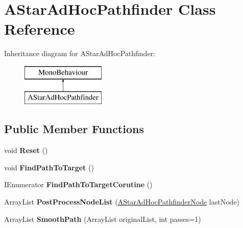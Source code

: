 \hypertarget{class_a_star_ad_hoc_pathfinder}{\section{A\+Star\+Ad\+Hoc\+Pathfinder Class Reference}
\label{class_a_star_ad_hoc_pathfinder}
}
Inheritance diagram for A\+Star\+Ad\+Hoc\+Pathfinder\+:\begin{figure}[H]
\begin{center}
\leavevmode
\includegraphics[height=2.000000cm]{class_a_star_ad_hoc_pathfinder}
\end{center}
\end{figure}
\subsection*{Public Member Functions}
\begin{DoxyCompactItemize}
\item 
\hypertarget{class_a_star_ad_hoc_pathfinder_aa31719400e49672181dd2becf4b6c259}{void {\bfseries Reset} ()}\label{class_a_star_ad_hoc_pathfinder_aa31719400e49672181dd2becf4b6c259}

\item 
\hypertarget{class_a_star_ad_hoc_pathfinder_a2029b90076e70929f9ed3f524359235c}{void {\bfseries Find\+Path\+To\+Target} ()}\label{class_a_star_ad_hoc_pathfinder_a2029b90076e70929f9ed3f524359235c}

\item 
\hypertarget{class_a_star_ad_hoc_pathfinder_a2855db3735ca99c2f7e8038c6594aacc}{I\+Enumerator {\bfseries Find\+Path\+To\+Target\+Corutine} ()}\label{class_a_star_ad_hoc_pathfinder_a2855db3735ca99c2f7e8038c6594aacc}

\item 
\hypertarget{class_a_star_ad_hoc_pathfinder_a9d9516c7f212bf9cfe828ae2f0250210}{Array\+List {\bfseries Post\+Process\+Node\+List} (\hyperlink{class_a_star_ad_hoc_pathfinder_node}{A\+Star\+Ad\+Hoc\+Pathfinder\+Node} last\+Node)}\label{class_a_star_ad_hoc_pathfinder_a9d9516c7f212bf9cfe828ae2f0250210}

\item 
\hypertarget{class_a_star_ad_hoc_pathfinder_a87b5cf69f5cd3ce7509c1522e933cb5c}{Array\+List {\bfseries Smooth\+Path} (Array\+List original\+List, int passes=1)}\label{class_a_star_ad_hoc_pathfinder_a87b5cf69f5cd3ce7509c1522e933cb5c}

\end{DoxyCompactItemize}
